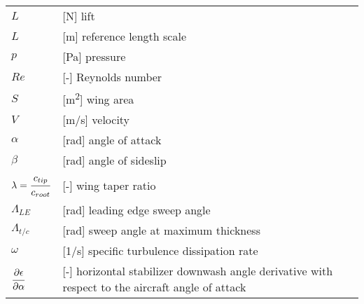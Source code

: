 \begin{longtable}[l]{ l p{} }
  $L$                                          & [N] lift \\
  $L$                                          & [m] reference length scale \\
  $p$                                          & [Pa] pressure \\
  $Re$                                         & [-] Reynolds number \\
  $S$                                          & [m\textsuperscript{2}] wing area \\
  $V$                                          & [m/s] velocity \\
  $\alpha$                                     & [rad] angle of attack \\
  $\beta$                                      & [rad] angle of sideslip \\
  $\lambda=\cfrac{c_{tip}}{c_{root}}$          & [-] wing taper ratio \\
  $\Lambda_{LE}$                               & [rad] leading edge sweep angle \\
  $\Lambda_{t/c}$                              & [rad] sweep angle at maximum thickness \\
  $\omega$                                     & [1/s] specific turbulence dissipation rate \\
  $\cfrac{\partial \epsilon}{\partial \alpha}$ & [-] horizontal stabilizer downwash angle derivative with respect to the aircraft angle of attack \\
\end{longtable}
